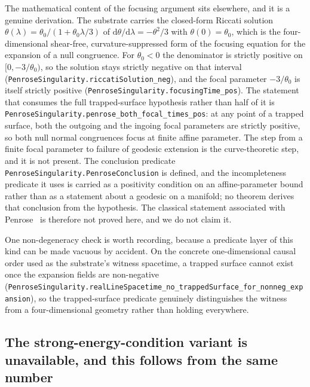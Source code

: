 \documentclass[aps,prd,nofootinbib,superscriptaddress,12pt]{revtex4-2}
\DeclareRobustCommand{\lb}{\discretionary{}{}{}}
\begin{document}
The mathematical content of the focusing argument sits elsewhere, and it is a
genuine derivation. The substrate carries the closed-form Riccati solution
$\theta(\lambda) = \theta_0 / (1 + \theta_0 \lambda / 3)$ of
$\mathrm{d}\theta/\mathrm{d}\lambda = -\theta^2/3$ with $\theta(0) = \theta_0$,
which is the four-dimensional shear-free, curvature-suppressed form of the
focusing equation for the expansion of a null congruence. For $\theta_0 < 0$ the
denominator is strictly positive on $[0, -3/\theta_0)$, so the solution stays
strictly negative on that interval
(\texttt{Penrose\lb{}Singularity.\lb{}riccati\lb{}Solution\_\lb{}neg}), and the focal parameter
$-3/\theta_0$ is itself strictly positive
(\texttt{Penrose\lb{}Singularity.\lb{}focusing\lb{}Time\_\lb{}pos}). The statement that consumes the
full trapped-surface hypothesis rather than half of it is
\texttt{Penrose\lb{}Singularity.\lb{}penrose\_\lb{}both\_\lb{}focal\_\lb{}times\_\lb{}pos}: at any point of a
trapped surface, both the outgoing and the ingoing focal parameters are strictly
positive, so both null normal congruences focus at finite affine parameter. The
step from a finite focal parameter to failure of geodesic extension is the
curve-theoretic step, and it is not present. The conclusion predicate
\texttt{Penrose\lb{}Singularity.\lb{}Penrose\lb{}Conclusion} is defined, and the incompleteness
predicate it uses is carried as a positivity condition on an affine-parameter
bound rather than as a statement about a geodesic on a manifold; no theorem
derives that conclusion from the hypothesis. The classical statement associated
with Penrose~\cite{Penrose1965} is therefore not proved here, and we do not claim
it.

One non-degeneracy check is worth recording, because a predicate layer of this
kind can be made vacuous by accident. On the concrete one-dimensional causal
order used as the substrate's witness spacetime, a trapped surface cannot exist
once the expansion fields are non-negative
(\texttt{Penrose\lb{}Singularity.\lb{}real\lb{}Line\lb{}Spacetime\_\lb{}no\_\lb{}trapped\lb{}Surface\_\lb{}for\_\lb{}nonneg\_\lb{}expansion}),
so the trapped-surface predicate genuinely distinguishes the witness from a
four-dimensional geometry rather than holding everywhere.

\subsection{The strong-energy-condition variant is unavailable, and this follows
from the same number}
\label{sec:bh-theorems-hp}
\end{document}
